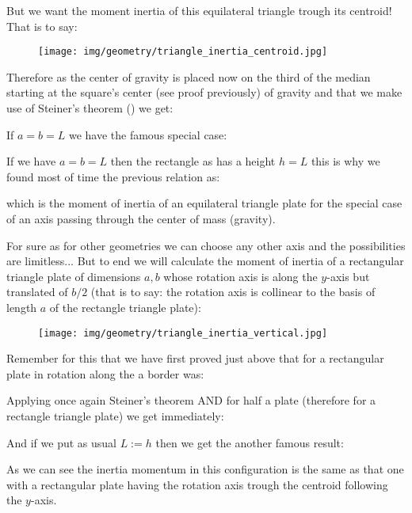{	But we want the moment inertia of this equilateral triangle trough its centroid! That is to say:
	\begin{figure}[H]
		\centering
		\texttt{[image: img/geometry/triangle\_inertia\_centroid.jpg]}
	\end{figure}
	Therefore as the center of gravity is placed now on the third of the median starting at the square's center (see proof previously) of gravity and that we make use of Steiner's theorem () we get:
	
	If $a=b=L$ we have the famous special case:
	
	If we have $a=b=L$ then the rectangle as has a height $h=L$ this is why we found most of time the previous relation as:
	
	which is the moment of inertia of an equilateral triangle plate for the special case of an axis passing through the center of mass (gravity).
	
	For sure as for other geometries we can choose any other axis and the possibilities are limitless... But to end we will calculate the moment of inertia of a rectangular triangle plate of dimensions $a,b$ whose rotation axis is along the $y$-axis but translated of $b/2$ (that is to say: the rotation axis is collinear to the basis of length $a$ of the rectangle triangle plate):
	\begin{figure}[H]
		\centering
		\texttt{[image: img/geometry/triangle\_inertia\_vertical.jpg]}
	\end{figure}
	Remember for this that we have first proved just above that for a rectangular plate in rotation along the a border was:
	
	Applying once again Steiner's theorem AND for half a plate (therefore for a rectangle triangle plate) we get immediately:
	
	And if we put as usual $L:=h$ then we get the another famous result:
	
	As we can see the inertia momentum in this configuration is the same as that one with a rectangular plate having the rotation axis trough the centroid following the $y$-axis.
	
}
